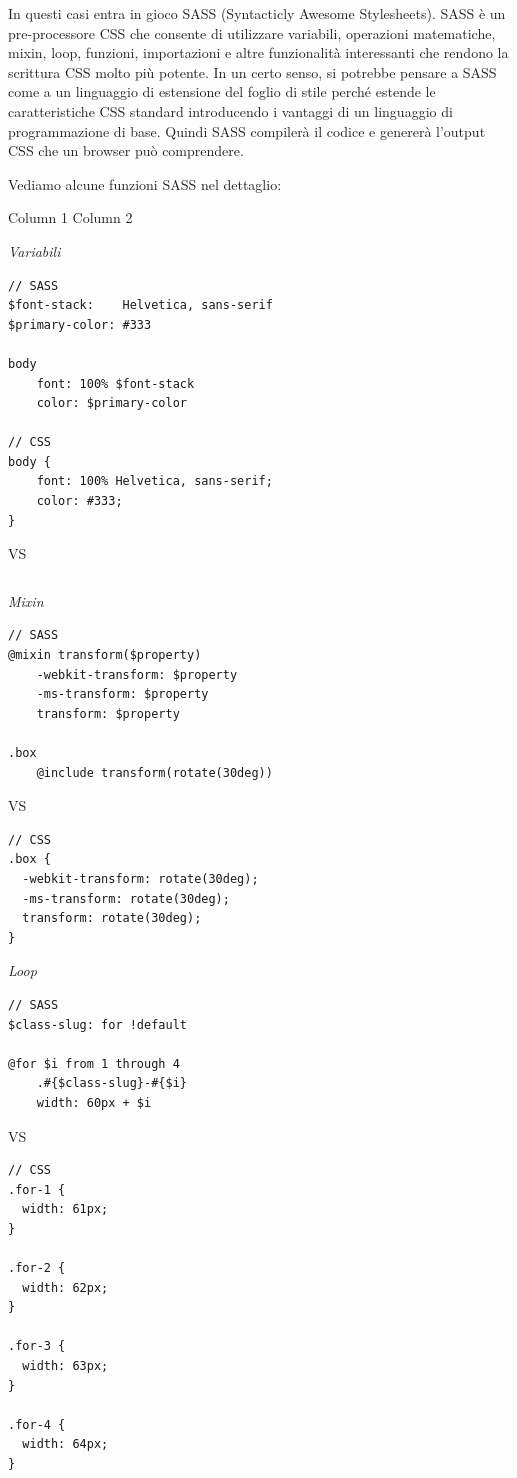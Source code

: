 In questi casi entra in gioco SASS (Syntacticly Awesome Stylesheets).
SASS è un pre-processore CSS che consente di utilizzare variabili, operazioni matematiche, mixin, loop, funzioni, importazioni 
e altre funzionalità interessanti che rendono la scrittura CSS molto più potente. In un certo senso, si potrebbe pensare a 
SASS come a un linguaggio di estensione del foglio di stile perché estende le caratteristiche CSS standard introducendo i
vantaggi di un linguaggio di programmazione di base. Quindi SASS compilerà il codice e genererà l'output CSS che un
browser può comprendere.

Vediamo alcune funzioni SASS nel dettaglio:

\begin{multicols}{2}
    Column 1
    \columnbreak
    Column 2
    \end{multicols}
    
\textit{Variabili}
\begin{lstlisting}
// SASS
$font-stack:    Helvetica, sans-serif
$primary-color: #333

body
    font: 100% $font-stack
    color: $primary-color

// CSS
body {
    font: 100% Helvetica, sans-serif;
    color: #333;
} 
\end{lstlisting}
VS
\begin{lstlisting}

\end{lstlisting}
    


\textit{Mixin}

\begin{lstlisting}
// SASS
@mixin transform($property) 
    -webkit-transform: $property
    -ms-transform: $property
    transform: $property

.box
    @include transform(rotate(30deg))   
\end{lstlisting}
VS
\begin{lstlisting}
// CSS
.box {
  -webkit-transform: rotate(30deg);
  -ms-transform: rotate(30deg);
  transform: rotate(30deg);
}
\end{lstlisting}

\textit{Loop}
\begin{lstlisting}
// SASS
$class-slug: for !default

@for $i from 1 through 4
    .#{$class-slug}-#{$i}
    width: 60px + $i
\end{lstlisting}
VS
\begin{lstlisting}
// CSS
.for-1 {
  width: 61px;
}

.for-2 {
  width: 62px;
}

.for-3 {
  width: 63px;
}

.for-4 {
  width: 64px;
}
\end{lstlisting}
      

